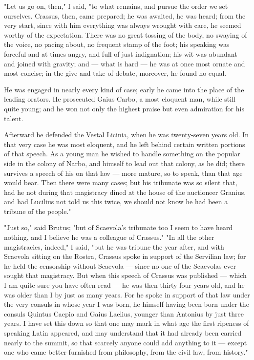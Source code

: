  "Let us go on, then," I said, "to what remains, and pursue the order we set ourselves. Crassus, then, came prepared; he was awaited, he was heard; from the very start, since with him everything was always wrought with care, he seemed worthy of the expectation. There was no great tossing of the body, no swaying of the voice, no pacing about, no frequent stamp of the foot; his speaking was forceful and at times angry, and full of just indignation; his wit was abundant and joined with gravity; and — what is hard — he was at once most ornate and most concise; in the give-and-take of debate, moreover, he found no equal.

 He was engaged in nearly every kind of case; early he came into the place of the leading orators. He prosecuted Gaius Carbo, a most eloquent man, while still quite young; and he won not only the highest praise but even admiration for his talent.

 Afterward he defended the Vestal Licinia, when he was twenty-seven years old. In that very case he was most eloquent, and he left behind certain written portions of that speech. As a young man he wished to handle something on the popular side in the colony of Narbo, and himself to lead out that colony, as he did; there survives a speech of his on that law — more mature, so to speak, than that age would bear. Then there were many cases; but his tribunate was so silent that, had he not during that magistracy dined at the house of the auctioneer Granius, and had Lucilius not told us this twice, we should not know he had been a tribune of the people."

 "Just so," said Brutus; "but of Scaevola's tribunate too I seem to have heard nothing, and I believe he was a colleague of Crassus." "In all the other magistracies, indeed," I said, "but he was tribune the year after, and with Scaevola sitting on the Rostra, Crassus spoke in support of the Servilian law; for he held the censorship without Scaevola — since no one of the Scaevolas ever sought that magistracy. But when this speech of Crassus was published — which I am quite sure you have often read — he was then thirty-four years old, and he was older than I by just as many years. For he spoke in support of that law under the very consuls in whose year I was born, he himself having been born under the consuls Quintus Caepio and Gaius Laelius, younger than Antonius by just three years. I have set this down so that one may mark in what age the first ripeness of speaking Latin appeared, and may understand that it had already been carried nearly to the summit, so that scarcely anyone could add anything to it — except one who came better furnished from philosophy, from the civil law, from history."

